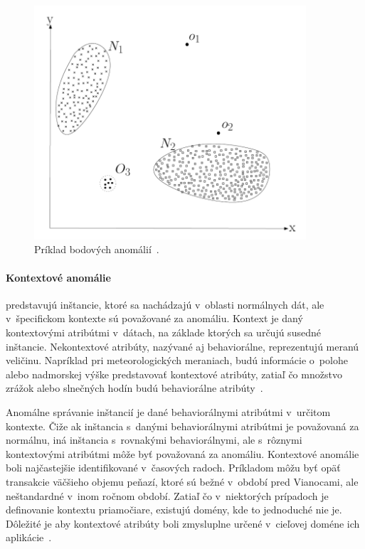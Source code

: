 \documentclass[a4paper,twoside,slovak,12pt,appendix]{article}
\begin{document}
\begin{figure}[htbp]
  \centering
  \includegraphics[width=0.9\textwidth]{point_anomalies.png}
  \caption[Príklad bodových anomálií.]{Príklad bodových anomálií~\cite{Chandola2009}.}
  \label{fig:point-anomalies}
\end{figure}

\paragraph{Kontextové anomálie} predstavujú inštancie, ktoré sa nachádzajú
v~oblasti normálnych dát, ale v~špecifickom kontexte sú považované za anomáliu.
Kontext je daný kontextovými atribútmi v~dátach, na základe ktorých sa určujú
susedné inštancie. Nekontextové atribúty, nazývané aj behaviorálne, reprezentujú
meranú veličinu. Napríklad pri meteorologických meraniach, budú informácie
o~polohe alebo nadmorskej výške predstavovať kontextové atribúty, zatiaľ čo
množstvo zrážok alebo slnečných hodín budú behaviorálne
atribúty~\cite{Song2007}.

Anomálne správanie inštancií je dané behaviorálnymi atribútmi v~určitom kontexte.
Čiže ak inštancia s~danými behaviorálnymi atribútmi je považovaná za normálnu,
iná inštancia s~rovnakými behaviorálnymi, ale s~rôznymi kontextovými atribútmi
môže byť považovaná za anomáliu. Kontextové anomálie boli najčastejšie
identifikované v~časových radoch. Príkladom môžu byť opäť transakcie väčšieho
objemu peňazí, ktoré sú bežné v~období pred Vianocami, ale neštandardné v~inom
ročnom období. Zatiaľ čo v~niektorých prípadoch je definovanie kontextu
priamočiare, existujú domény, kde to jednoduché nie je. Dôležité je aby
kontextové atribúty boli zmysluplne určené v~cieľovej doméne ich
aplikácie~\cite{Chandola2009,Song2007}.
\end{document}
